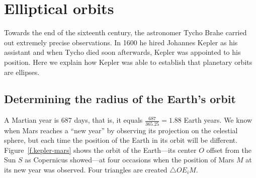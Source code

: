 

\chapter{Elliptical orbits}\label{s.kepler}

Towards the end of the sixteenth century, the astronomer Tycho Brahe carried out extremely precise observations. In 1600 he hired Johannes Kepler as his assistant and when Tycho died soon afterwards, Kepler was appointed to his position. Here we explain how Kepler was able to establish that planetary orbits are ellipses.

\section{Determining the radius of the Earth's orbit}

A Martian year is $687$ days, that is, it equals $\frac{687}{365.25} = 1.88$ Earth years. We know when Mars reaches a ``new year'' by observing its projection on the celestial sphere, but each time the position of the Earth in its orbit will be different. Figure~\ref{f.kepler-mars} shows the orbit of the Earth---its center $O$ offset from the Sun $S$ as Copernicus showed---at four occasions when the position of Mars $M$ at its new year was observed. Four triangles are created $\triangle OE_iM$.


